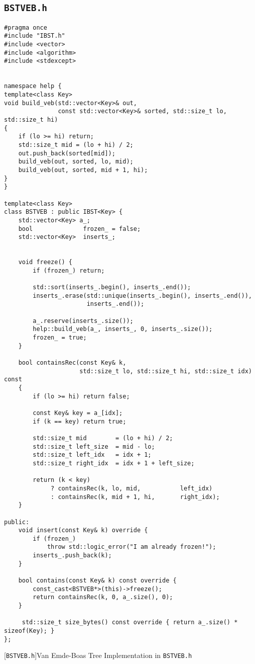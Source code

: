 \subsection{\texttt{BSTVEB.h}}
\label{secsec:vb}
\begin{lstlisting}
#pragma once
#include "IBST.h"
#include <vector>
#include <algorithm>
#include <stdexcept>


namespace help {
template<class Key>
void build_veb(std::vector<Key>& out,
               const std::vector<Key>& sorted, std::size_t lo, std::size_t hi)
{
    if (lo >= hi) return;                       
    std::size_t mid = (lo + hi) / 2;            
    out.push_back(sorted[mid]);                 
    build_veb(out, sorted, lo, mid);            
    build_veb(out, sorted, mid + 1, hi);        
}
} 

template<class Key>
class BSTVEB : public IBST<Key> {
    std::vector<Key> a_;            
    bool              frozen_ = false;
    std::vector<Key>  inserts_;     


    void freeze() {
        if (frozen_) return;

        std::sort(inserts_.begin(), inserts_.end());
        inserts_.erase(std::unique(inserts_.begin(), inserts_.end()),
                       inserts_.end());

        a_.reserve(inserts_.size());
        help::build_veb(a_, inserts_, 0, inserts_.size());
        frozen_ = true;
    }

    bool containsRec(const Key& k,
                     std::size_t lo, std::size_t hi, std::size_t idx) const
    {
        if (lo >= hi) return false;            

        const Key& key = a_[idx];
        if (k == key) return true;

        std::size_t mid        = (lo + hi) / 2;
        std::size_t left_size  = mid - lo;    
        std::size_t left_idx   = idx + 1;   
        std::size_t right_idx  = idx + 1 + left_size;

        return (k < key)
             ? containsRec(k, lo, mid,           left_idx)
             : containsRec(k, mid + 1, hi,       right_idx);
    }

public:
    void insert(const Key& k) override {
        if (frozen_)
            throw std::logic_error("I am already frozen!");
        inserts_.push_back(k);
    }

    bool contains(const Key& k) const override {
        const_cast<BSTVEB*>(this)->freeze();   
        return containsRec(k, 0, a_.size(), 0);
    }

     std::size_t size_bytes() const override { return a_.size() * sizeof(Key); }
};

\end{lstlisting}
[\texttt{BSTVEB.h}]{Van Emde-Boas Tree Implementation in \texttt{BSTVEB.h}}
\label{lst:btsvb}

